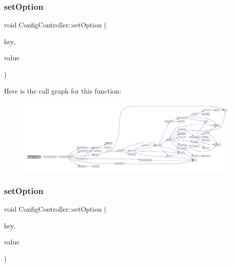 \subsubsection{\texorpdfstring{set\+Option}{setOption}\hspace{0.1cm}{\footnotesize\ttfamily [4/5]}}
{\footnotesize\ttfamily void Config\+Controller\+::set\+Option (\begin{DoxyParamCaption}\item[{const char $\ast$}]{key,  }\item[{const char $\ast$}]{value }\end{DoxyParamCaption})\hspace{0.3cm}{\ttfamily [slot]}}

Here is the call graph for this function\+:
\nopagebreak
\begin{figure}[H]
\begin{center}
\leavevmode
\includegraphics[width=350pt]{class_q_g_b_a_1_1_config_controller_abbb3d3f7816f281b88629a65dd9eb096_cgraph}
\end{center}
\end{figure}
\mbox{\label{class_q_g_b_a_1_1_config_controller_ad4512bbe0cc12a07bdd1bc1091767be9}} 
\subsubsection{\texorpdfstring{set\+Option}{setOption}\hspace{0.1cm}{\footnotesize\ttfamily [5/5]}}
{\footnotesize\ttfamily void Config\+Controller\+::set\+Option (\begin{DoxyParamCaption}\item[{const char $\ast$}]{key,  }\item[{const Q\+Variant \&}]{value }\end{DoxyParamCaption})\hspace{0.3cm}{\ttfamily [slot]}}

